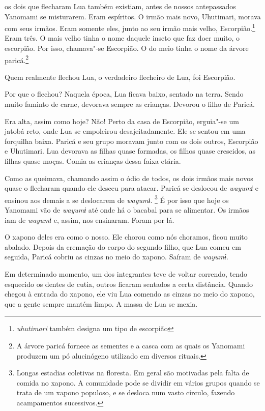  

 os dois que flecharam Lua também existiam, antes de nossos
antepassados Yanomami se misturarem. Eram espíritos. O irmão mais novo,
Uhutimari, morava com seus irmãos. Eram somente eles, junto ao seu irmão
mais velho, Escorpião.\footnote{  \emph{uhutimari} também designa um tipo de escorpião} Eram três. O mais velho tinha o nome daquele
inseto que faz doer muito, o escorpião. Por isso, chamava"-se Escorpião.
O do meio tinha o nome da árvore paricá.\footnote{  A árvore paricá fornece as sementes e a casca com as quais os Yanomami
produzem um pó alucinógeno utilizado em diversos rituais.} 

Quem realmente flechou Lua, o verdadeiro flecheiro de Lua, foi
Escorpião. 

Por que o flechou? Naquela época, Lua ficava baixo, sentado na
terra. Sendo muito faminto de carne, devorava sempre as crianças.
Devorou o filho de Paricá. 

Era alta, assim como hoje? Não! Perto da casa de Escorpião, erguia"-se um
jatobá reto, onde Lua se empoleirou desajeitadamente. Ele se sentou em
uma forquilha baixa. Paricá e seu grupo moravam junto com os dois
outros, Escorpião e Uhutimari. Lua devorava as filhas quase formadas,
os filhos quase crescidos, as filhas quase moças. Comia as crianças
dessa faixa etária. 

Como as queimava, chamando assim o ódio de todos, os dois irmãos
mais novos quase o flecharam quando ele desceu para
atacar. Paricá se deslocou de \emph{wayumɨ} e ensinou aos
demais a se deslocarem de \emph{wayumɨ}. \footnote{   Longas estadias coletivas na floresta. Em geral são motivadas pela falta de comida no xapono. A comunidade pode se dividir em vários grupos quando se trata de um xapono populoso, e se desloca num vasto círculo, fazendo acampamentos sucessivos.} É por isso que hoje os Yanomami
vão de \emph{wayumɨ} até onde há o bacabal para se alimentar. Os irmãos iam
de \emph{wayumɨ} e, assim, nos ensinaram. Foram por lá.

O xapono deles era como o nosso. Ele chorou como nós choramos, ficou
muito abalado. Depois da cremação do corpo do segundo filho, que Lua
comeu em seguida, Paricá cobriu as cinzas no meio do xapono. Saíram
de \emph{wayumɨ}. 

Em determinado momento, um dos integrantes teve de voltar correndo,
tendo esquecido os dentes de cutia, outros ficaram sentados a certa
distância. Quando chegou à entrada do xapono, ele viu Lua comendo as
cinzas no meio do xapono, que a gente sempre mantém limpo. A massa de
Lua se mexia.

